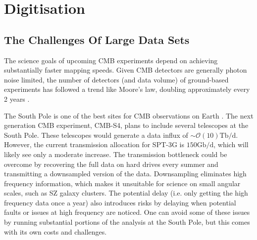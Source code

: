 \documentclass[apj]{emulateapj}
\begin{document}





\section{Digitisation}
\label{sec:dig}

\subsection{The Challenges Of Large Data Sets}
\label{subsec:problem}


The science goals of upcoming CMB experiments depend on achieving substantially faster mapping speeds. Given CMB detectors are generally photon noise limited, the number of detectors (and data volume) of ground-based experiments has followed a trend like Moore's law, doubling approximately every 2 years \citep{s4sciencebook, Abazajian2015}.

The South Pole is one of the best sites for CMB observations on Earth \citep{kovac2007}. The next generation CMB experiment, CMB-S4, plans to include several telescopes at the South Pole. These telescopes would generate a data influx of $\sim \mathcal{O}(10)\mathrm{Tb/d}$. However, the current transmission allocation for SPT-3G is $150\mathrm{Gb/d}$, which will likely see only a moderate increase. The transmission bottleneck could be overcome by recovering the full data on hard drives every summer and transmitting a downsampled version of the data. Downsampling eliminates high frequency information, which makes it unsuitable for science on small angular scales, such as SZ galaxy clusters. The potential delay (i.e. only getting the high frequency data once a year) also introduces risks by delaying when potential faults or issues at high frequency are noticed. One can avoid some of these issues by running substantial portions of the analysis at the South Pole, but this comes with its own costs and challenges.
\end{document}
